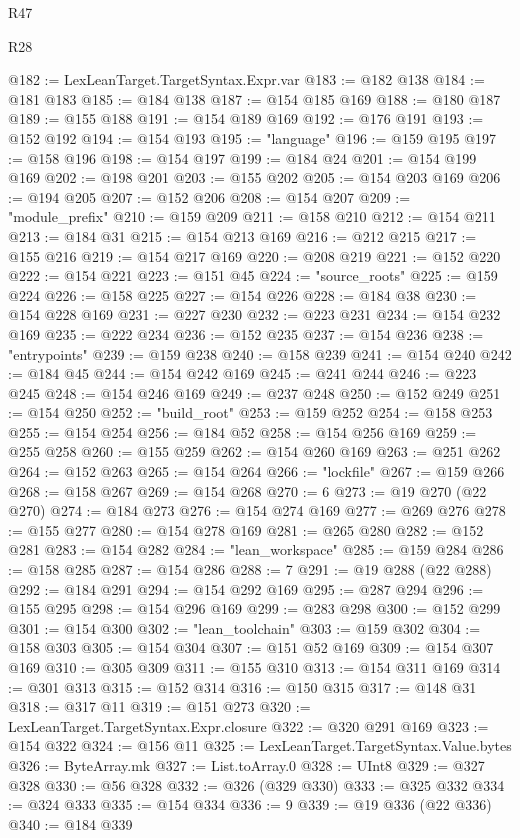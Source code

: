 \begin{lexlean}{R47}
\begin{lexlean}{R28}
\begin{coremodule}
{{{{{{{{{{{{{{{{{{{{{{{{{{{{{{{{{{{{{{{{{{{{{{{{{{{{{{{{{{{{{{{{{{{{{{{{{{{{{{{{{{{{{{{{{{{{{{{{{{{{{{{{{{{{{{{{{{{{{{{{{{{{{{{{{{{{{@182 := LexLeanTarget.TargetSyntax.Expr.var
@183 := @182 @138
@184 := @181 @183
@185 := @184 @138
@187 := @154 @185 @169
@188 := @180 @187
@189 := @155 @188
@191 := @154 @189 @169
@192 := @176 @191
@193 := @152 @192
@194 := @154 @193
@195 := "language"
@196 := @159 @195
@197 := @158 @196
@198 := @154 @197
@199 := @184 @24
@201 := @154 @199 @169
@202 := @198 @201
@203 := @155 @202
@205 := @154 @203 @169
@206 := @194 @205
@207 := @152 @206
@208 := @154 @207
@209 := "module_prefix"
@210 := @159 @209
@211 := @158 @210
@212 := @154 @211
@213 := @184 @31
@215 := @154 @213 @169
@216 := @212 @215
@217 := @155 @216
@219 := @154 @217 @169
@220 := @208 @219
@221 := @152 @220
@222 := @154 @221
@223 := @151 @45
@224 := "source_roots"
@225 := @159 @224
@226 := @158 @225
@227 := @154 @226
@228 := @184 @38
@230 := @154 @228 @169
@231 := @227 @230
@232 := @223 @231
@234 := @154 @232 @169
@235 := @222 @234
@236 := @152 @235
@237 := @154 @236
@238 := "entrypoints"
@239 := @159 @238
@240 := @158 @239
@241 := @154 @240
@242 := @184 @45
@244 := @154 @242 @169
@245 := @241 @244
@246 := @223 @245
@248 := @154 @246 @169
@249 := @237 @248
@250 := @152 @249
@251 := @154 @250
@252 := "build_root"
@253 := @159 @252
@254 := @158 @253
@255 := @154 @254
@256 := @184 @52
@258 := @154 @256 @169
@259 := @255 @258
@260 := @155 @259
@262 := @154 @260 @169
@263 := @251 @262
@264 := @152 @263
@265 := @154 @264
@266 := "lockfile"
@267 := @159 @266
@268 := @158 @267
@269 := @154 @268
@270 := 6
@273 := @19 @270 (@22 @270)
@274 := @184 @273
@276 := @154 @274 @169
@277 := @269 @276
@278 := @155 @277
@280 := @154 @278 @169
@281 := @265 @280
@282 := @152 @281
@283 := @154 @282
@284 := "lean_workspace"
@285 := @159 @284
@286 := @158 @285
@287 := @154 @286
@288 := 7
@291 := @19 @288 (@22 @288)
@292 := @184 @291
@294 := @154 @292 @169
@295 := @287 @294
@296 := @155 @295
@298 := @154 @296 @169
@299 := @283 @298
@300 := @152 @299
@301 := @154 @300
@302 := "lean_toolchain"
@303 := @159 @302
@304 := @158 @303
@305 := @154 @304
@307 := @151 @52 @169
@309 := @154 @307 @169
@310 := @305 @309
@311 := @155 @310
@313 := @154 @311 @169
@314 := @301 @313
@315 := @152 @314
@316 := @150 @315
@317 := @148 @31
@318 := @317 @11
@319 := @151 @273
@320 := LexLeanTarget.TargetSyntax.Expr.closure
@322 := @320 @291 @169
@323 := @154 @322
@324 := @156 @11
@325 := LexLeanTarget.TargetSyntax.Value.bytes
@326 := ByteArray.mk
@327 := List.toArray.{0}
@328 := UInt8
@329 := @327 @328
@330 := @56 @328
@332 := @326 (@329 @330)
@333 := @325 @332
@334 := @324 @333
@335 := @154 @334
@336 := 9
@339 := @19 @336 (@22 @336)
@340 := @184 @339
}}}}}}}}}}}}}}}}}}}}}}}}}}}}}}}}}}}}}}}}}}}}}}}}}}}}}}}}}}}}}}}}}}}}}}}}}}}}}}}}}}}}}}}}}}}}}}}}}}}}}}}}}}}}}}}}}}}}}}}}}}}}}}}}}}}}}
\end{coremodule}
\end{lexlean}
\end{lexlean}
